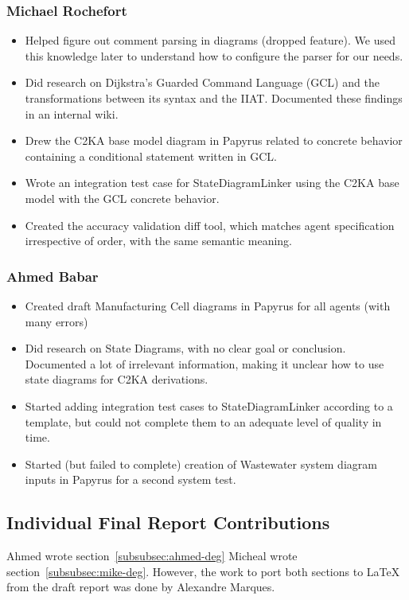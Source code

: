 \subsubsection{Michael Rochefort}
\begin{itemize}
    \item Helped figure out comment parsing in diagrams (dropped feature).
    We used this knowledge later to understand how to configure the parser for our needs.
    \item Did research on Dijkstra's Guarded Command Language (GCL) and the transformations between its syntax and the IIAT.
    Documented these findings in an internal wiki.
    \item Drew the C2KA base model diagram in Papyrus related to concrete behavior containing a conditional statement written in GCL.
    \item Wrote an integration test case for StateDiagramLinker using the C2KA base model with the GCL concrete behavior.
    \item Created the accuracy validation diff tool, which matches agent specification irrespective of order, with the same semantic meaning.
\end{itemize}

\subsubsection{Ahmed Babar}
\begin{itemize}
    \item Created draft Manufacturing Cell diagrams in Papyrus for all agents (with many errors)
    \item Did research on State Diagrams, with no clear goal or conclusion.
    Documented a lot of irrelevant information, making it unclear how to use state diagrams for C2KA derivations.
    \item Started adding integration test cases to StateDiagramLinker according to a template,
    but could not complete them to an adequate level of quality in time.
    \item Started (but failed to complete) creation of Wastewater system diagram inputs in Papyrus for a second system test.
\end{itemize}

\subsection{Individual Final Report Contributions}\label{subsec:individual-final-report-contributions}
Ahmed wrote section~\ref{subsubsec:ahmed-deg}
Micheal wrote section~\ref{subsubsec:mike-deg}.
However, the work to port both sections to LaTeX from the draft report was done by Alexandre Marques.

